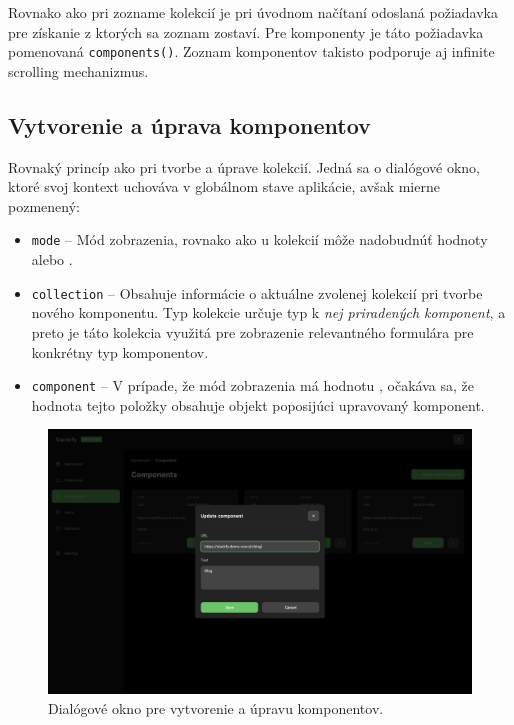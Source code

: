 \noindent Rovnako ako pri zozname kolekcií je pri úvodnom načítaní odoslaná požiadavka pre získanie z ktorých sa zoznam zostaví. Pre komponenty je táto požiadavka pomenovaná \texttt{components()}. Zoznam komponentov takisto podporuje aj infinite scrolling mechanizmus.

\subsection{Vytvorenie a úprava komponentov}
Rovnaký princíp ako pri tvorbe a úprave kolekcií. Jedná sa o dialógové okno, ktoré svoj kontext uchováva v globálnom stave aplikácie, avšak mierne pozmenený:

\begin{itemize}
	\item \texttt{mode} -- Mód zobrazenia, rovnako ako u kolekcií môže nadobudnúť hodnoty  alebo .
	\item \texttt{collection} -- Obsahuje informácie o aktuálne zvolenej kolekcií pri tvorbe nového komponentu. Typ kolekcie určuje typ k \emph{nej priradených komponent}, a preto je táto kolekcia využitá pre zobrazenie relevantného formulára pre konkrétny typ komponentov.
	\item \texttt{component} -- V prípade, že mód zobrazenia má hodnotu , očakáva sa, že hodnota tejto položky obsahuje objekt poposijúci upravovaný komponent.
\end{itemize}

\begin{figure}[h]
	\centering
	\includegraphics[scale=0.085]{obrazky-figures/screenshot_component_update}
	\caption{Dialógové okno pre vytvorenie a úpravu komponentov.}
\end{figure}

